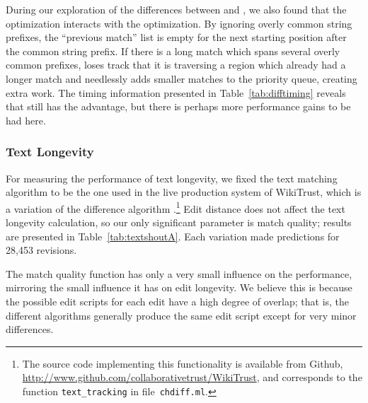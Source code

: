 During our exploration of the differences between 
and , we also found that the 
optimization interacts with the  optimization.
By ignoring overly common string prefixes, the ``previous match'' list
is empty for the next starting position after the common string prefix.
If there is a long match which spans several overly common prefixes,
 loses track that it is traversing a region which
already had a longer match and needlessly adds smaller matches to the
priority queue, creating extra work.
The timing information presented in Table~\ref{tab:difftiming} reveals
that  still has the advantage, but there is perhaps
more performance gains to be had here.


\subsubsection{Text Longevity}

For measuring the performance of text longevity,
we fixed the text matching algorithm to be the one
used in the live production system of WikiTrust,
which is a variation of the difference algorithm
.\footnote{The source code implementing
this functionality is available from Github,
\url{http://www.github.com/collaborativetrust/WikiTrust},
and corresponds to the function \texttt{text\_tracking}
in file~\texttt{chdiff.ml}.}
Edit distance does not affect the text longevity calculation,
so our only significant parameter is match quality;
results are presented in Table~\ref{tab:textshoutA}.
Each variation made predictions for 28,453 revisions.

The match quality function has only a very small influence on
the performance, mirroring the small influence it has on edit longevity.
We believe this is because the possible edit scripts for
each edit have a high degree of overlap; that is,
the different algorithms generally produce the same edit script
except for very minor differences.


